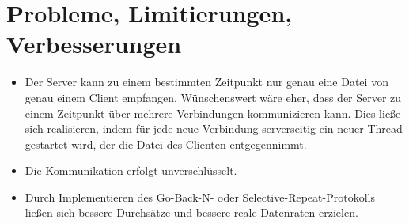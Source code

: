 \documentclass{scrartcl}
\begin{document}
\section{Probleme, Limitierungen, Verbesserungen}
\begin{itemize}
\item Der Server kann zu einem bestimmten Zeitpunkt nur genau eine Datei von genau einem Client empfangen. Wünschenswert wäre eher, dass der Server zu einem Zeitpunkt über mehrere Verbindungen  kommunizieren kann. Dies ließe sich realisieren, indem für jede neue Verbindung serverseitig ein neuer Thread gestartet wird, der die Datei des Clienten entgegennimmt. 
\item Die Kommunikation erfolgt unverschlüsselt.
\item Durch Implementieren des Go-Back-N- oder Selective-Repeat-Protokolls ließen sich bessere Durchsätze und bessere reale Datenraten erzielen.
\end{itemize}
\end{document}

